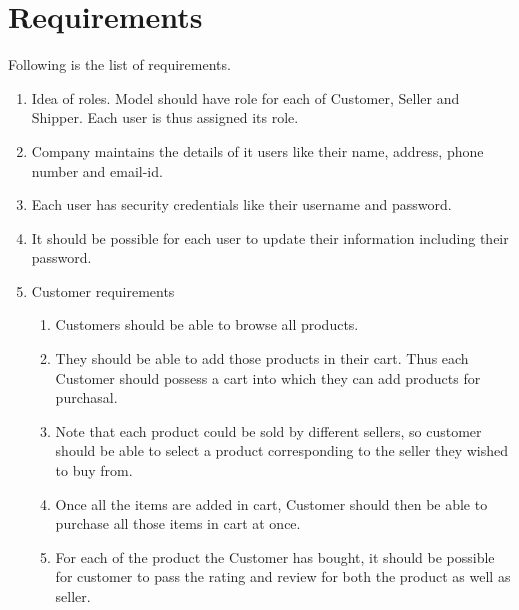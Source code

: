 \documentclass[a4paper,12pt]{article}
\begin{document}
\section{Requirements}
Following is the list of requirements.
\begin{enumerate}
  \item Idea of roles. Model should have role for each of Customer, Seller and Shipper. Each user is thus assigned its role.

  \item Company maintains the details of it users like their name, address, phone number and email-id.

  \item Each user has security credentials like their username and password.
  \item It should be possible for each user to update their information including their password.
  \item Customer requirements
  \begin{enumerate}
    \item Customers should be able to browse all products.
    \item They should be able to add those products in their cart. Thus each Customer should possess a cart into which they can add products for purchasal.
    \item Note that each product could be sold by different sellers, so customer should be able to select a product corresponding to the seller they wished to buy from. 
    \item Once all the items are added in cart, Customer should then be able to purchase all those items in cart at once.
    \item For each of the product the Customer has bought, it should be possible for customer to pass the rating and review for both the product as well as seller. 
  \end{enumerate}


\end{enumerate}
\end{document}
